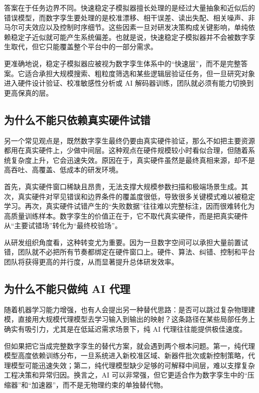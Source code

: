 \documentclass[11pt,a4paper]{article}
\begin{document}
答案在于任务边界不同。快速稳定子模拟器擅长处理的是经过大量抽象和近似后的错误模型，而数字孪生要处理的是校准漂移、相干误差、读出失配、相关噪声、非马尔可夫效应以及控制时序细节。这些因素一旦对研发决策构成关键影响，单纯依赖稳定子近似就可能产生系统偏差。也就是说，快速稳定子模拟器并不会被数字孪生取代，但它只能覆盖整个平台中的一部分需求。

更准确地说，稳定子模拟器应被视为数字孪生体系中的“快速层”，而不是完整答案。它适合承担大规模搜索、粗粒度筛选和某些逻辑层验证任务，但一旦研究对象进入硬件设计验证、校准敏感性分析或 AI 解码器训练，团队就必须有能力切换到更高保真的层。

\subsection{为什么不能只依赖真实硬件试错}

另一个常见观点是，既然数字孪生最终仍要由真实硬件验证，那么不如把主要资源都用在真实硬件上，少做中间层。这种观点在硬件规模较小时看似合理，但随着系统复杂度上升，它会迅速失效。原因在于，真实硬件虽然是最终真相来源，却不是高吞吐、高覆盖、低成本的研发环境。

首先，真实硬件窗口稀缺且昂贵，无法支撑大规模参数扫描和极端场景生成。其次，真实硬件对罕见错误和边界条件的覆盖度很低，导致很多关键模式难以被稳定学习。再次，真实硬件试错产生的“失败数据”往往难以完整标注，因而很难转化为高质量训练样本。数字孪生的价值正在于，它不取代真实硬件，而是把真实硬件从“主要试错场”转化为“最终校验场”。

从研发组织角度看，这种转变尤为重要。因为一旦数字空间可以承担大量前置试错，团队就不必把所有节奏都绑定在硬件窗口上。硬件、算法、纠错、控制和平台团队将获得更高的并行度，从而显著提升总体研发效率。

\subsection{为什么不能只做纯 AI 代理}

随着机器学习能力增强，也有人会提出另一种替代思路：是否可以跳过复杂物理建模，直接用大规模代理模型去学习输入到输出的映射？这条路径在某些局部任务上确实有吸引力，尤其是在低延迟需求场景下，纯 AI 代理往往能提供极佳速度。

但如果把它当成完整数字孪生的替代方案，就会遇到两个根本问题。第一，纯代理模型高度依赖训练分布，一旦系统进入新校准区域、新器件批次或新控制策略，代理模型可能迅速失效；第二，纯代理模型缺少足够的可解释中间层，难以支撑复杂工程决策和异常归因。换言之，AI 可以非常强，但它更适合作为数字孪生中的“压缩器”和“加速器”，而不是无物理约束的单独替代物。
\end{document}
